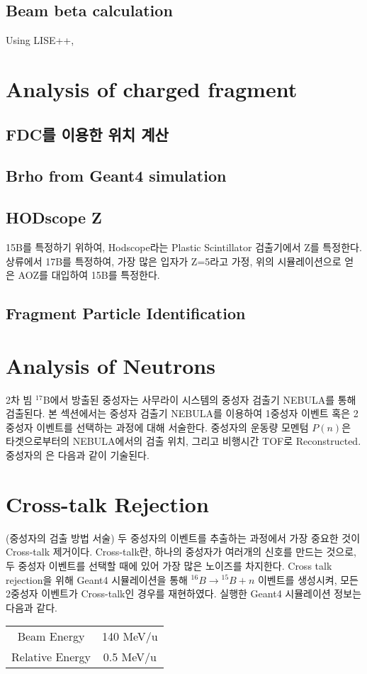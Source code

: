 \subsection{Beam beta calculation}
Using LISE++, 

\section{Analysis of charged fragment}
\subsection{FDC를 이용한 위치 계산}
\subsection{Brho from Geant4 simulation}
\subsection{HODscope Z}
15B를 특정하기 위하여, Hodscope라는 Plastic Scintillator 검출기에서 Z를 특정한다.
상류에서 17B를 특정하여, 가장 많은 입자가 Z=5라고 가정, 위의 시뮬레이션으로 얻은 AOZ를 대입하여 15B를 특정한다.
\subsection{Fragment Particle Identification}

\clearpage

\section{Analysis of Neutrons}
2차 빔 ${}^{17}$B에서 방출된 중성자는 사무라이 시스템의 중성자 검출기 NEBULA를 통해 검출된다. 본 섹션에서는 중성자 검출기 NEBULA를 이용하여 1중성자 이벤트 혹은 2중성자 이벤트를 선택하는 과정에 대해 서술한다. 중성자의 운동량 모멘텀 $P(n)$은 타겟으로부터의 NEBULA에서의 검출 위치, 그리고 비행시간 TOF로 Reconstructed. 중성자의 은 다음과 같이 기술된다.


\section{Cross-talk Rejection}
(중성자의 검출 방법 서술) 두 중성자의 이벤트를 추출하는 과정에서 가장 중요한 것이 Cross-talk 제거이다. Cross-talk란, 하나의 중성자가 여러개의 신호를 만드는 것으로, 두 중성자 이벤트를 선택할 때에 있어 가장 많은 노이즈를 차지한다. 
Cross talk rejection을 위해 Geant4 시뮬레이션을 통해 ${}^{16}B\to{}^{15}B+n$ 이벤트를 생성시켜, 모든 2중성자 이벤트가 Cross-talk인 경우를 재현하였다. 실행한 Geant4 시뮬레이션 정보는 다음과 같다.
\begin{center}
    \begin{tabular}[h]{c|c}
        \hline
        Beam Energy & 140 MeV/u\\
        Relative Energy & 0.5 MeV/u\\
        \hline
    \end{tabular}
\end{center}

